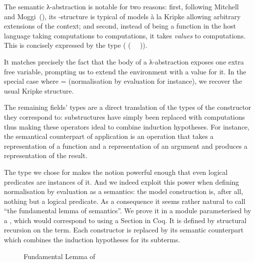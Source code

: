 
The semantic λ-abstraction is notable for two reasons: first, following
Mitchell and Moggi~(\citeyear{mitchell1991kripke}), its -structure is
typical of models à la Kripke allowing arbitrary extensions of the context;
and second, instead of being a function in the host language taking
computations to computations,  it takes \emph{values} to computations.
This is concisely expressed by the type ({ (~  ~)}).

It matches precisely the fact that the body of a λ-abstraction exposes
one extra free variable, prompting us to extend the environment with a
value for it. In the special case where  =  (normalisation
by evaluation for instance), we recover the usual Kripke structure.


The remaining fields' types are a direct translation of the types of the
constructor they correspond to: substructures have simply been replaced with
computations thus making these operators ideal to combine induction hypotheses.
For instance, the semantical counterpart of application is an operation that
takes a representation of a function and a representation of an argument and
produces a representation of the result.


The type we chose for  makes the  notion powerful enough that
even logical predicates are instances of it. And we indeed exploit this power when
defining normalisation by evaluation as a semantics: the model construction is, after
all, nothing but a logical predicate. As a consequence it seems rather natural to call
 ``the fundamental lemma of semantics''. We prove it in a module parameterised
by a , which would correspond to using a Section in Coq. It is defined by
structural recursion on the term. Each constructor is replaced by its semantic counterpart
which combines the induction hypotheses for its subterms.

\begin{figure}[h]
\caption{Fundamental Lemma of \label{fig:fundsem}}
\end{figure}

